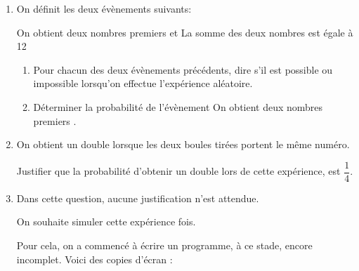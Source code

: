 \begin{enumerate}
\item On définit les deux évènements suivants:

\og On obtient deux nombres premiers \fg{} et \og La somme des deux nombres est égale à 12 \fg
	\begin{enumerate}
		\item Pour chacun des deux évènements précédents, dire s'il est possible ou impossible lorsqu'on effectue l'expérience aléatoire.
		\item Déterminer la probabilité de l'évènement \og On obtient deux nombres premiers \fg.
	\end{enumerate}
\item On obtient un \og double \fg{} lorsque les deux boules tirées portent le même numéro. 

Justifier que la probabilité d'obtenir un \og double \fg{} lors de cette expérience, est $\dfrac{1}{4}$.
\item Dans cette question, aucune justification n'est attendue. 

On souhaite simuler cette expérience  fois.

Pour cela, on a commencé à écrire un programme, à ce stade, encore incomplet. Voici des copies d'écran :


\end{enumerate}
